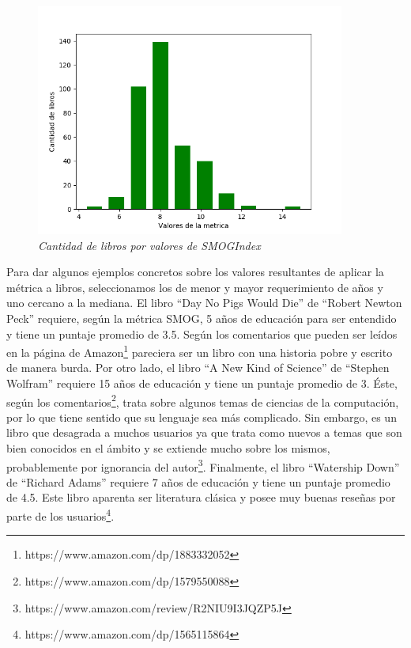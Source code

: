 \documentclass[12pt,journal,compsoc]{IEEEtran}
\begin{document}
\begin{figure}[H]
\begin{center}
  \includegraphics[width=4.0in]{../unigrams/scripts/histogram/08-SMOGIndexhistogram.png}
  \caption{\small \textit{Cantidad de libros por valores de SMOGIndex}}
  \label{fig:histoSMOG}
  \end{center}
\end{figure}

Para dar algunos ejemplos concretos sobre los valores resultantes de aplicar la métrica a libros, seleccionamos los de menor y mayor requerimiento de años y uno cercano a la mediana. El libro ``Day No Pigs Would Die'' de ``Robert Newton Peck'' requiere, según la métrica SMOG, 5 años de educación para ser entendido y tiene un puntaje promedio de 3.5. Según los comentarios que pueden ser leídos en la página de Amazon\footnote{https://www.amazon.com/dp/1883332052} pareciera ser un libro con una historia pobre y escrito de manera burda. Por otro lado, el libro ``A New Kind of Science'' de ``Stephen Wolfram'' requiere 15 años de educación y tiene un puntaje promedio de 3. Éste, según los comentarios\footnote{https://www.amazon.com/dp/1579550088}, trata sobre algunos temas de ciencias de la computación, por lo que tiene sentido que su lenguaje sea más complicado. Sin embargo, es un libro que desagrada a muchos usuarios ya que trata como nuevos a temas que son bien conocidos en el ámbito y se extiende mucho sobre los mismos, probablemente por ignorancia del autor\footnote{https://www.amazon.com/review/R2NIU9I3JQZP5J}. Finalmente, el libro ``Watership Down'' de ``Richard Adams'' requiere 7 años de educación y tiene un puntaje promedio de 4.5. Este libro aparenta ser literatura clásica y posee muy buenas reseñas por parte de los usuarios\footnote{https://www.amazon.com/dp/1565115864}.
\end{document}
